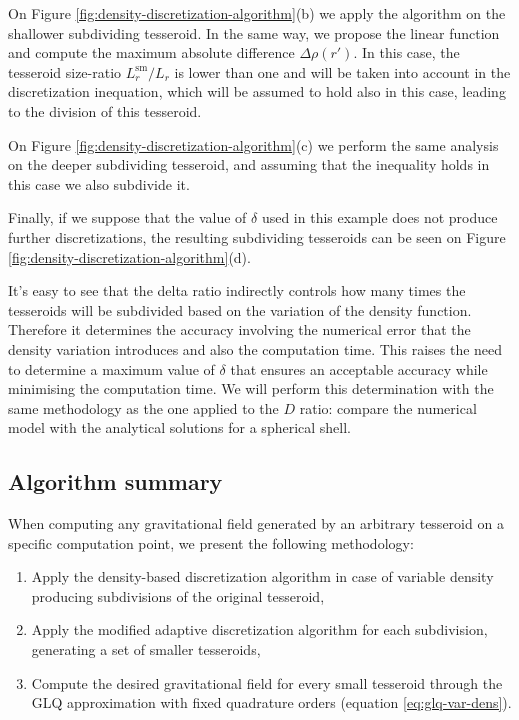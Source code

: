 \documentclass[extra]{gji}
\begin{document}
On Figure \ref{fig:density-discretization-algorithm}(b) we apply the 
algorithm on the shallower subdividing tesseroid.
In the same way, we propose the linear function and compute the maximum 
absolute difference $\Delta \rho (r')$.
In this case, the tesseroid size-ratio $L_r^\text{sm}/L_r$ is lower 
than one and will be taken into account in the discretization 
inequation, which will be assumed to hold also in this case, leading to 
the division of this tesseroid.

On Figure \ref{fig:density-discretization-algorithm}(c) we perform the 
same analysis on the deeper subdividing tesseroid, and assuming that the 
inequality holds in this case we also subdivide it.

Finally, if we suppose that the value of $\delta$ used in this example 
does not produce further discretizations, the resulting subdividing 
tesseroids can be seen on Figure 
\ref{fig:density-discretization-algorithm}(d).

It's easy to see that the delta ratio indirectly controls how many 
times the tesseroids will be subdivided based on the variation of the 
density function.
Therefore it determines the accuracy involving the numerical error that 
the density variation introduces and also the computation time.
This raises the need to determine a maximum value of $\delta$ that 
ensures an acceptable accuracy while minimising the computation time. 
We will perform this determination with the same methodology as the one 
applied to the $D$ ratio: compare the numerical model with the 
analytical solutions for a spherical shell.


\subsection{Algorithm summary}

When computing any gravitational field generated by an arbitrary tesseroid on 
a specific computation point, we present the following methodology:

\begin{enumerate}
    \renewcommand{\theenumi}{(\arabic{enumi})}
    \item Apply the density-based discretization algorithm in case of 
          variable density producing subdivisions of the original tesseroid,
    \item Apply the modified adaptive discretization algorithm for 
          each subdivision, generating a set of smaller tesseroids,
    \item Compute the desired gravitational field for every small tesseroid 
          through the GLQ approximation with fixed quadrature orders
          (equation \ref{eq:glq-var-dens}).
\end{enumerate}
\end{document}
